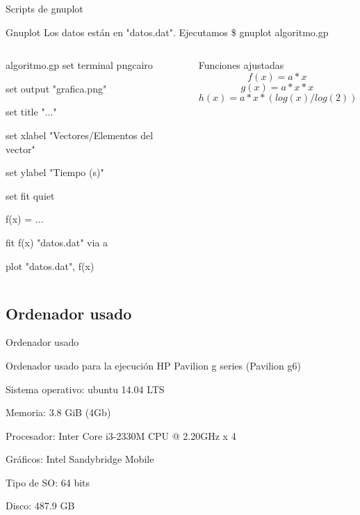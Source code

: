 
\begin{frame}{Scripts de gnuplot}
	\begin{block}{Gnuplot}		
		Los datos están en "datos.dat". Ejecutamos		
		\hspace{1cm}\$ gnuplot algoritmo.gp
	\end{block}
	\pause
	
	\begin{columns}

	\begin{column}{5cm}
	\begin{exampleblock}{algoritmo.gp}
	set terminal pngcairo
	
	set output "grafica.png"

	set title "..."

	set xlabel "Vectores/Elementos del vector"

	set ylabel "Tiempo (s)"

	set fit quiet

	f(x) = ...

	fit f(x) "datos.dat" via a

	plot "datos.dat", f(x)
	\end{exampleblock}
	\end{column}
	\pause
	
	\begin{column}{5cm}
	\begin{block}{Funciones ajustadas}
		\[f(x) = a*x\]
		\[g(x) = a*x*x\]
		\[h(x) = a*x*(log(x)/log(2))\]
	\end{block}
	\end{column}
	
	\end{columns}
\end{frame}

\subsection{Ordenador usado}
\begin{frame}{Ordenador usado}
	\begin{alertblock}{Ordenador usado para la ejecuci\'on}
	HP Pavilion g series (Pavilion g6)

	Sistema operativo: ubuntu 14.04 LTS

	Memoria: 3.8 GiB (4Gb)

	Procesador: Inter Core i3-2330M CPU @ 2.20GHz x 4

	Gráficos: Intel Sandybridge Mobile

	Tipo de SO: 64 bits

	Disco: 487.9 GB	
	\end{alertblock}
\end{frame}


